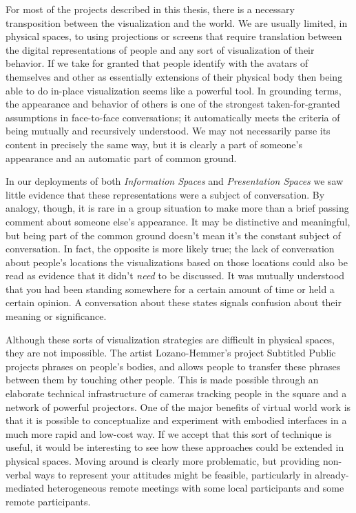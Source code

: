 
For most of the projects described in this thesis, there is a necessary transposition between the visualization and the world. We are usually limited, in physical spaces, to using projections or screens that require translation between the digital representations of people and any sort of visualization of their behavior. If we take for granted that people identify with the avatars of themselves and other as essentially extensions of their physical body  then being able to do in-place visualization seems like a powerful tool. In grounding terms, the appearance and behavior of others is one of the strongest taken-for-granted assumptions in face-to-face conversations; it automatically meets the criteria of being mutually and recursively understood. We may not necessarily parse its content in precisely the same way, but it is clearly a part of someone's appearance and an automatic part of common ground. 

In our deployments of both \emph{Information Spaces} and \emph{Presentation Spaces} we saw little evidence that these representations were a subject of conversation. By analogy, though, it is rare in a group situation to make more than a brief passing comment about someone else's appearance. It may be distinctive and meaningful, but being part of the common ground doesn't mean it's the constant subject of conversation. In fact, the opposite is more likely true; the lack of conversation about people's locations the visualizations based on those locations could also be read as evidence that it didn't \emph{need} to be discussed. It was mutually understood that you had been standing somewhere for a certain amount of time or held a certain opinion. A conversation about these states signals confusion about their meaning or significance.

Although these sorts of visualization strategies are difficult in physical spaces, they are not impossible. The artist Lozano-Hemmer's project Subtitled Public \citep{SubtitledPublic:2005wt} projects phrases on people's bodies, and allows people to transfer these phrases between them by touching other people. This is made possible through an elaborate technical infrastructure of cameras tracking people in the square and a network of powerful projectors. One of the major benefits of virtual world work is that it is possible to conceptualize and experiment with embodied interfaces in a much more rapid and low-cost way. If we accept that this sort of technique is useful, it would be interesting to see how these approaches could be extended in physical spaces. Moving around is clearly more problematic, but providing non-verbal ways to represent your attitudes might be feasible, particularly in already-mediated heterogeneous remote meetings with some local participants and some remote participants.

